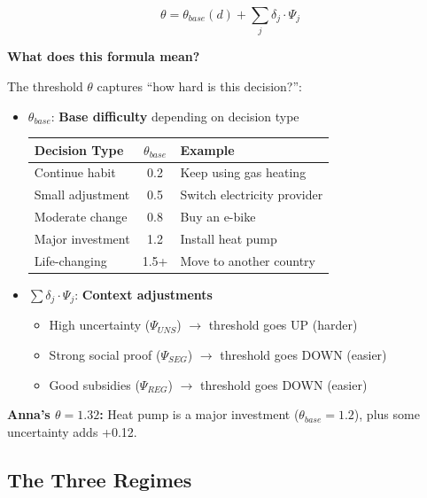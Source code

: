\begin{equation}
\boxed{\theta = \theta_{base}(d) + \sum_{j} \delta_j \cdot \Psi_j}
\label{eq:theta-formula}
\end{equation}

\begin{intuition}
\textbf{What does this formula mean?}

The threshold $\theta$ captures ``how hard is this decision?'':

\begin{itemize}
\item $\theta_{base}$: \textbf{Base difficulty} depending on decision type
\begin{center}
\begin{tabular}{lcp{6cm}}
Decision Type & $\theta_{base}$ & Example\\
\hline
Continue habit & 0.2 & Keep using gas heating\\
Small adjustment & 0.5 & Switch electricity provider\\
Moderate change & 0.8 & Buy an e-bike\\
Major investment & 1.2 & Install heat pump\\
Life-changing & 1.5+ & Move to another country\\
\end{tabular}
\end{center}

\item $\sum \delta_j \cdot \Psi_j$: \textbf{Context adjustments}
\begin{itemize}
\item High uncertainty ($\Psi_{UNS}$) $\rightarrow$ threshold goes UP (harder)
\item Strong social proof ($\Psi_{SEG}$) $\rightarrow$ threshold goes DOWN (easier)
\item Good subsidies ($\Psi_{REG}$) $\rightarrow$ threshold goes DOWN (easier)
\end{itemize}
\end{itemize}

\textbf{Anna's $\theta = 1.32$:} Heat pump is a major investment ($\theta_{base} = 1.2$), plus some uncertainty adds +0.12.
\end{intuition}

\subsection{The Three Regimes}


